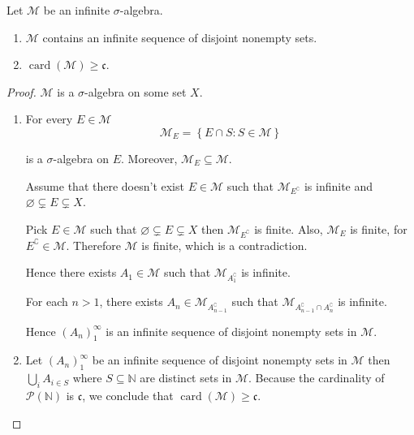 \newpage

\begin{exercise}
    Let \( \mathcal{M} \) be an infinite \( \sigma \)-algebra.
    \begin{enumerate}[itemsep=0pt,label=\textbf{\alph*.}]
        \item \( \mathcal{M} \) contains an infinite sequence of disjoint nonempty sets.
        \item \( \operatorname{card}(\mathcal{M}) \ge \mathfrak{c} \).
    \end{enumerate}
\end{exercise}

\begin{proof}
    \( \mathcal{M} \) is a \( \sigma \)-algebra on some set \( X \).
    \begin{enumerate}[itemsep=0pt,label=\textbf{\alph*.}]
        \item For every \( E \in \mathcal{M} \)
              \[
                  \mathcal{M}_{E} = \left\{ E \cap S : S \in \mathcal{M} \right\}
              \]

              is a \( \sigma \)-algebra on \( E \). Moreover, \( \mathcal{M}_{E} \subseteq \mathcal{M} \).

              Assume that there doesn't exist \( E \in \mathcal{M} \) such that \( \mathcal{M}_{E^{\complement}} \) is infinite and \( \varnothing \subsetneq E \subsetneq X \).

              Pick \( E \in \mathcal{M} \) such that \( \varnothing \subsetneq E \subsetneq X \) then \( \mathcal{M}_{E^{\complement}} \) is finite. Also, \( \mathcal{M}_{E} \) is finite, for \( E^{\complement} \in \mathcal{M} \). Therefore \( \mathcal{M} \) is finite, which is a contradiction.

              Hence there exists \( A_{1} \in \mathcal{M} \) such that \( \mathcal{M}_{A_{1}^{\complement}} \) is infinite.

              For each \( n > 1 \), there exists \( A_{n} \in \mathcal{M}_{A_{n-1}^{\complement}} \) such that \( \mathcal{M}_{A_{n-1}^{\complement} \cap A_{n}^{\complement}} \) is infinite.

              Hence \( {(A_{n})}_{1}^{\infty} \) is an infinite sequence of disjoint nonempty sets in \( \mathcal{M} \).
        \item Let \( {(A_{n})}_{1}^{\infty} \) be an infinite sequence of disjoint nonempty sets in \( \mathcal{M} \) then \( \bigcup_{i} A_{i \in S} \) where \( S \subseteq \mathbb{N} \) are distinct sets in \( \mathcal{M} \). Because the cardinality of \( \mathcal{P}(\mathbb{N}) \) is \( \mathfrak{c} \), we conclude that \( \operatorname{card}(\mathcal{M}) \ge \mathfrak{c} \).
    \end{enumerate}
\end{proof}

